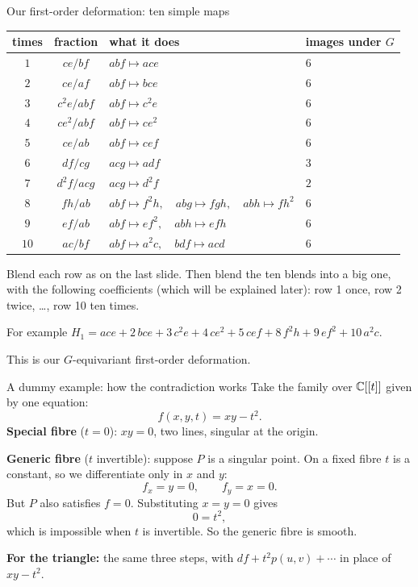 \begin{frame}{Our first-order deformation: ten simple maps}
\begin{center}
\small\renewcommand{\arraystretch}{0.85}
\begin{tabular}{ccll}
times&fraction&what it does&images under \(G\)\\\hline
\(1\)&\(ce/bf\)&\(abf\mapsto ace\)&\(6\)\\
\(2\)&\(ce/af\)&\(abf\mapsto bce\)&\(6\)\\
\(3\)&\(c^2e/abf\)&\(abf\mapsto c^2e\)&\(6\)\\
\(4\)&\(ce^2/abf\)&\(abf\mapsto ce^2\)&\(6\)\\
\(5\)&\(ce/ab\)&\(abf\mapsto cef\)&\(6\)\\
\(6\)&\(df/cg\)&\(acg\mapsto adf\)&\(3\)\\
\(7\)&\(d^2f/acg\)&\(acg\mapsto d^2f\)&\(2\)\\
\(8\)&\(fh/ab\)&\(abf\mapsto f^2h,\quad abg\mapsto fgh,\quad abh\mapsto fh^2\)&\(6\)\\
\(9\)&\(ef/ab\)&\(abf\mapsto ef^2,\quad abh\mapsto efh\)&\(6\)\\
\(10\)&\(ac/bf\)&\(abf\mapsto a^2c,\quad bdf\mapsto acd\)&\(6\)
\end{tabular}
\end{center}
Blend each row as on the last slide. Then blend the ten blends into a big one, with the following coefficients (which will be explained later): row 1 once, row 2 twice, \dots, row 10 ten times.
\par
For example \(H_1=ace+2\,bce+3\,c^2e+4\,ce^2+5\,cef+8\,f^2h+9\,ef^2+10\,a^2c\).
\par
This is our \(G\)-equivariant first-order deformation.
\end{frame}


\begin{frame}{A dummy example: how the contradiction works}
Take the family over \(\mathbb C[[t]]\) given by one equation:
\[
\boxed{f(x,y,t)=xy-t^2.}
\]
\textbf{Special fibre} (\(t=0\)): \(xy=0\), two lines, singular at the origin.
\par\medskip
\textbf{Generic fibre} (\(t\) invertible): suppose \(P\) is a singular point. On a fixed fibre \(t\) is a constant, so we differentiate only in \(x\) and \(y\):
\[
f_x=y=0,\qquad f_y=x=0.
\]
But \(P\) also satisfies \(f=0\). Substituting \(x=y=0\) gives
\[
\boxed{0=t^2,}
\]
which is impossible when \(t\) is invertible. So the generic fibre is smooth.
\par\medskip
\textbf{For the triangle:} the same three steps, with \(df+t^2p(u,v)+\cdots\) in place of \(xy-t^2\).
\end{frame}

